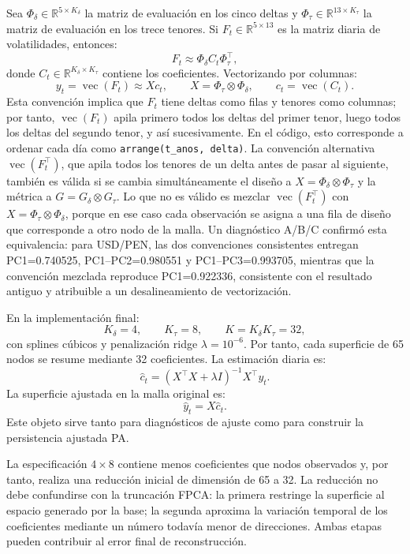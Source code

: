 \documentclass[a4paper,11pt]{article}
\newcommand{\R}{\mathbb{R}}
\begin{document}
Sea \(\Phi_\delta\in\R^{5\times K_\delta}\) la matriz de evaluación en los cinco deltas y \(\Phi_\tau\in\R^{13\times K_\tau}\) la matriz de evaluación en los trece tenores. Si \(F_t\in\R^{5\times 13}\) es la matriz diaria de volatilidades, entonces:
\[
  F_t\approx \Phi_\delta C_t\Phi_\tau^\top,
\]
donde \(C_t\in\R^{K_\delta\times K_\tau}\) contiene los coeficientes. Vectorizando por columnas:
\[
  y_t=\operatorname{vec}(F_t)\approx Xc_t,
  \qquad
  X=\Phi_\tau\otimes \Phi_\delta,
  \qquad
  c_t=\operatorname{vec}(C_t).
\]
Esta convención implica que \(F_t\) tiene deltas como filas y tenores como columnas; por tanto, \(\operatorname{vec}(F_t)\) apila primero todos los deltas del primer tenor, luego todos los deltas del segundo tenor, y así sucesivamente. En el código, esto corresponde a ordenar cada día como \texttt{arrange(t\_anos, delta)}. La convención alternativa \(\operatorname{vec}(F_t^\top)\), que apila todos los tenores de un delta antes de pasar al siguiente, también es válida si se cambia simultáneamente el diseño a \(X=\Phi_\delta\otimes\Phi_\tau\) y la métrica a \(G=G_\delta\otimes G_\tau\). Lo que no es válido es mezclar \(\operatorname{vec}(F_t^\top)\) con \(X=\Phi_\tau\otimes\Phi_\delta\), porque en ese caso cada observación se asigna a una fila de diseño que corresponde a otro nodo de la malla. Un diagnóstico A/B/C confirmó esta equivalencia: para USD/PEN, las dos convenciones consistentes entregan PC1=0.740525, PC1--PC2=0.980551 y PC1--PC3=0.993705, mientras que la convención mezclada reproduce PC1=0.922336, consistente con el resultado antiguo y atribuible a un desalineamiento de vectorización.

En la implementación final:
\[
  K_\delta=4,\qquad K_\tau=8,\qquad K=K_\delta K_\tau=32,
\]
con splines cúbicos y penalización ridge \(\lambda=10^{-6}\). Por tanto, cada superficie de 65 nodos se resume mediante 32 coeficientes. La estimación diaria es:
\[
  \widehat c_t=(X^\top X+\lambda I)^{-1}X^\top y_t.
\]
La superficie ajustada en la malla original es:
\[
  \widehat y_t=X\widehat c_t.
\]
Este objeto sirve tanto para diagnósticos de ajuste como para construir la persistencia ajustada PA.

La especificación \(4\times 8\) contiene menos coeficientes que nodos observados y, por tanto, realiza una reducción inicial de dimensión de 65 a 32. La reducción no debe confundirse con la truncación FPCA: la primera restringe la superficie al espacio generado por la base; la segunda aproxima la variación temporal de los coeficientes mediante un número todavía menor de direcciones. Ambas etapas pueden contribuir al error final de reconstrucción.
\end{document}

